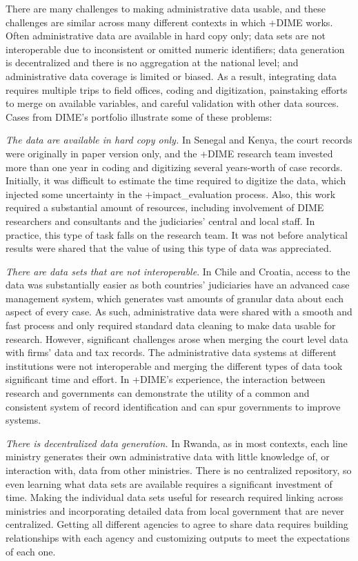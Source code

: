 \documentclass[
]{book}
\begin{document}
There are many challenges to making administrative data usable, and these challenges are similar across many different contexts in which +DIME\textbar{} works. Often administrative data are available in hard copy only; data sets are not interoperable due to inconsistent or omitted numeric identifiers; data generation is decentralized and there is no aggregation at the national level; and administrative data coverage is limited or biased. As a result, integrating data requires multiple trips to field offices, coding and digitization, painstaking efforts to merge on available variables, and careful validation with other data sources. Cases from DIME's portfolio illustrate some of these problems:

\emph{The data are available in hard copy only.} In Senegal and Kenya, the court records were originally in paper version only, and the +DIME\textbar{} research team invested more than one year in coding and digitizing several years-worth of case records. Initially, it was difficult to estimate the time required to digitize the data, which injected some uncertainty in the +impact\_evaluation\textbar{} process. Also, this work required a substantial amount of resources, including involvement of DIME researchers and consultants and the judiciaries' central and local staff. In practice, this type of task falls on the research team. It was not before analytical results were shared that the value of using this type of data was appreciated.

\emph{There are data sets that are not interoperable}. In Chile and Croatia, access to the data was substantially easier as both countries' judiciaries have an advanced case management system, which generates vast amounts of granular data about each aspect of every case. As such, administrative data were shared with a smooth and fast process and only required standard data cleaning to make data usable for research. However, significant challenges arose when merging the court level data with firms' data and tax records. The administrative data systems at different institutions were not interoperable and merging the different types of data took significant time and effort. In +DIME\textbar's experience, the interaction between research and governments can demonstrate the utility of a common and consistent system of record identification and can spur governments to improve systems.

\emph{There is decentralized data generation.} In Rwanda, as in most contexts, each line ministry generates their own administrative data with little knowledge of, or interaction with, data from other ministries. There is no centralized repository, so even learning what data sets are available requires a significant investment of time. Making the individual data sets useful for research required linking across ministries and incorporating detailed data from local government that are never centralized. Getting all different agencies to agree to share data requires building relationships with each agency and customizing outputs to meet the expectations of each one.
\end{document}
